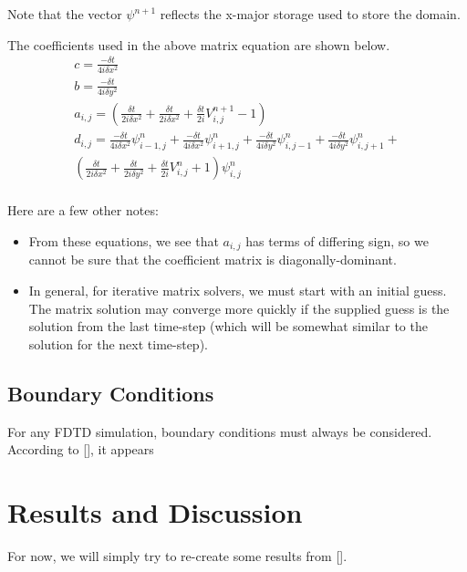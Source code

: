 \documentclass[letterpaper,12pt]{article}
\begin{document}
Note that the vector $\psi^{n+1}$ reflects the x-major storage used to store the domain.   

The coefficients used in the above matrix equation are shown below.
\begin{equation}
\begin{split}
c = \frac{-\delta t}{4i\delta x^2} \\
b = \frac{-\delta t}{4i\delta y^2} \\
a_{i,j} = (  \frac{\delta t}{2i\delta x^2} + \frac{\delta t}{2i\delta x^2} + \frac{\delta t} {2i}V^{n+1}_{i,j} - 1) \\
d_{i,j} = 	\frac{-\delta t}{4i\delta x^2}\psi^n_{i-1,j} + 
			\frac{-\delta t}{4i\delta x^2}\psi^n_{i+1,j} +
			\frac{-\delta t}{4i\delta y^2}\psi^n_{i,j-1} + 
 			\frac{-\delta t}{4i\delta y^2}\psi^n_{i,j+1} + \\ 
			(  \frac{\delta t}{2i\delta x^2} + \frac{\delta t}{2i\delta y^2} + \frac{\delta t} 				{2i}V^n_{i,j} + 1)\psi^n_{i,j}\\
\end{split}
\end{equation}

Here are a few other notes:
\begin{itemize}
  \item From these equations, we see that $a_{i,j}$ has terms of differing sign, so we cannot be sure that the coefficient matrix is diagonally-dominant.
  \item In general, for iterative matrix solvers, we must start with an initial guess.  The matrix solution may converge more quickly if the supplied guess is the solution from the last time-step (which will be somewhat similar to the solution for the next time-step).
  
\end{itemize}

\subsection{Boundary Conditions}

For any FDTD simulation, boundary conditions must always be considered.  According to [], it appears 

\section{Results and Discussion} 

For now, we will simply try to re-create some results from [].
\end{document}
